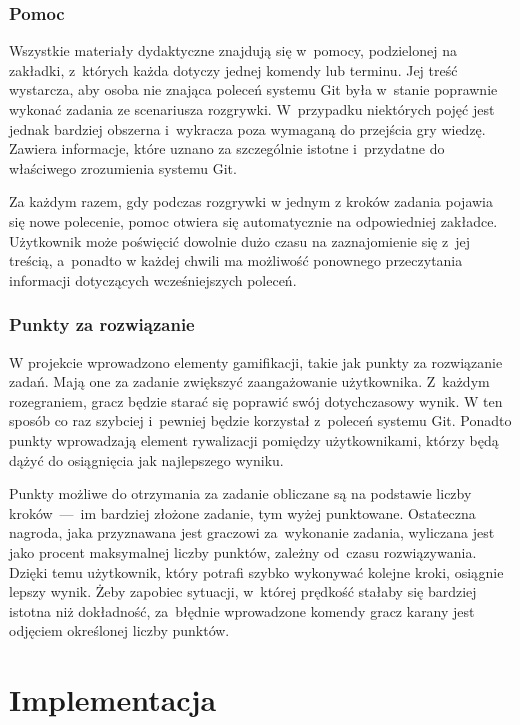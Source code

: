 \documentclass[12pt,a4paper,polish,thesis]{dcsbook}
\begin{document}
{	\subsection{Pomoc}
	
	Wszystkie materiały dydaktyczne znajdują się w~pomocy, podzielonej na zakładki, z~których każda dotyczy jednej komendy lub terminu. Jej treść wystarcza, aby osoba nie znająca poleceń systemu Git była w~stanie poprawnie wykonać zadania ze scenariusza rozgrywki. W~przypadku niektórych pojęć jest jednak bardziej obszerna i~wykracza poza wymaganą do przejścia gry wiedzę. Zawiera informacje, które uznano za szczególnie istotne i~przydatne do właściwego zrozumienia systemu Git.
	
	Za każdym razem, gdy podczas rozgrywki w jednym z kroków zadania pojawia się nowe polecenie, pomoc otwiera się automatycznie na odpowiedniej zakładce. Użytkownik może poświęcić dowolnie dużo czasu na zaznajomienie się z~jej treścią, a~ponadto w każdej chwili ma możliwość ponownego przeczytania informacji dotyczących wcześniejszych poleceń.  
	
	\subsection{Punkty za rozwiązanie}

	W projekcie wprowadzono elementy gamifikacji, takie jak punkty za rozwiązanie zadań. Mają one za zadanie zwiększyć zaangażowanie użytkownika. Z~każdym rozegraniem, gracz będzie starać się poprawić swój dotychczasowy wynik. W ten sposób co raz szybciej i~pewniej będzie korzystał z~poleceń systemu Git. Ponadto punkty wprowadzają element rywalizacji pomiędzy użytkownikami, którzy będą dążyć do osiągnięcia jak najlepszego wyniku.

	Punkty możliwe do otrzymania za zadanie obliczane są na podstawie liczby kroków~---~im bardziej złożone zadanie, tym wyżej punktowane. Ostateczna nagroda, jaka przyznawana jest graczowi za~wykonanie zadania, wyliczana jest jako procent maksymalnej liczby punktów, zależny od~czasu rozwiązywania. Dzięki temu użytkownik, który potrafi szybko wykonywać kolejne kroki, osiągnie lepszy wynik. Żeby zapobiec sytuacji, w~której prędkość stałaby się bardziej istotna niż dokładność, za~błędnie wprowadzone komendy gracz karany jest odjęciem określonej liczby punktów.
	
	\chapter{Implementacja} \label{Implementacja}

}
\end{document}
